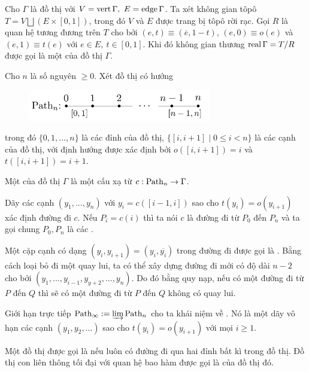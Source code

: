 \begin{define}
    Cho $\Gamma$ là đồ thị với $V = \operatorname{vert} \Gamma,\ E = \operatorname{edge} \Gamma$. Ta xét không gian tôpô $T = V \bigsqcup (E \times [0,1])$, trong đó $V$ và $E$ được trang bị tôpô rời rạc. Gọi $R$ là quan hệ tương đương trên $T$ cho bởi $(e,t) \equiv (\overline{e}, 1-t)$, $(e,0) \equiv o(e)$ và $(e,1) \equiv t(e)$ với $e \in E,\ t \in [0,1]$. Khi đó không gian thương $\operatorname{real} \Gamma = T/R$ được gọi là một  của đồ thị $\Gamma$.
\end{define}

\begin{define}
    Cho $n$ là số nguyên $\geq 0$. Xét đồ thị có hướng
    \begin{figure}[H]
        \includegraphics[width=8cm]{assets/path-graph.png}
        \centering
    \end{figure}
    trong đó $\{0,1,...,n\}$ là các đỉnh của đồ thị, $\{[i,i+1] \mid 0 \leq i < n \}$ là các cạnh của đồ thị, với định hướng được xác định bởi $o([i,i+1]) = i$ và $t([i,i+1]) = i+1$.
\end{define}

\begin{define}
    Một  của đồ thị $\Gamma$ là một cấu xạ từ $c: \operatorname{Path}_n \rightarrow \Gamma$.

    Dãy các cạnh $(y_1,...,y_n)$ với $y_i = c([i-1,i])$ sao cho $t(y_i) = o(y_{i+1})$ xác định đường đi $c$. Nếu $P_i = c(i)$ thì ta nói $c$ là đường đi từ $P_0$ đến $P_n$ và ta gọi chung $P_0, P_n$ là các .

    Một cặp cạnh có dạng $(y_i,y_{i+1}) = (y_i,\overline{y_i})$ trong đường đi được gọi là . Bằng cách loại bỏ đi một quay lui, ta có thể xây dựng đường đi mới có độ dài $n-2$ cho bởi $(y_1,...,y_{i-1},y_{y+2},...,y_n)$. Do đó bằng quy nạp, nếu có một đường đi từ $P$ đến $Q$ thì sẽ có một đường đi từ $P$ đến $Q$ không có quay lui.

    Giới hạn trực tiếp $\operatorname{Path}_{\infty} := \varinjlim \operatorname{Path}_n$ cho ta khái niệm về . Nó là một dãy vô hạn các cạnh $(y_1,y_2,...)$ sao cho $t(y_i) = o(y_{i+1})$ với mọi $i \geq 1$.
\end{define}

\begin{define}
    Một đồ thị được gọi là  nếu luôn có đường đi qua hai đỉnh bất kì trong đồ thị. Đồ thị con liên thông tối đại với quan hệ bao hàm được gọi là  của đồ thị đó.
\end{define}

